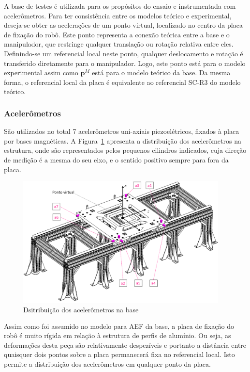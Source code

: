 A base de testes é utilizada para os propósitos do ensaio e instrumentada com
acelerômetros. Para ter consistência entre os modelos teórico e experimental,
deseja-se obter as acelerações de um ponto virtual, localizado no centro da
placa de fixação do robô. Este ponto representa a conexão teórica entre a base e
o manipulador, que restringe qualquer translação ou rotação relativa entre eles.
Definindo-se um referencial local neste ponto, qualquer deslocamento e rotação
é transferido diretamente para o manipulador. Logo, este
ponto está para o modelo experimental assim como $\mathbf{p}^M$ está para o
modelo teórico da base. Da mesma forma, o referencial local da placa é
equivalente ao referencial SC-R3 do modelo teórico.

\subsubsection{Acelerômetros}

São utilizados no total 7 acelerômetros uni-axiais piezoelétricos, fixados à
placa por bases magnéticas. A Figura~\ref{fig::acelerometos-base} apresenta a
distribuição dos acelerômetros na estrutura, onde são representados pelos
pequenos cilindros indicados, cuja direção de medição é a mesma do seu eixo, e o
sentido positivo sempre para fora da placa.

\begin{figure}[h]
	\centering 
 	\includegraphics[width=0.95\textwidth]{figs/acelerometos-base}
 	\caption{Dsitribuição dos acelerômetros na base}
 	\label{fig::acelerometos-base}
\end{figure}

Assim como foi assumido no modelo para AEF da base, a placa de fixação do robô é
muito rígida em relação à estrutura de perfis de alumínio. Ou seja, as
deformações desta peça são relativamente despezíveis e portanto a distância
entre quaisquer dois pontos sobre a placa permanecerá fixa no referencial local.
Isto permite a distribuição dos acelerômetros em qualquer ponto da placa.

